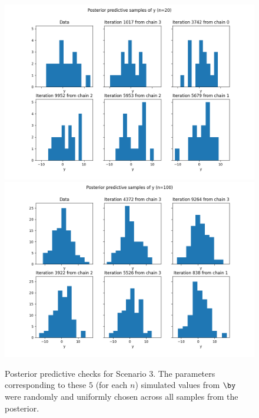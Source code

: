 \documentclass[a4paper, 10pt]{article}
\begin{document}
\begin{figure}[htb]
    \begin{center}
        \includegraphics[height=.5\textwidth]{../outputs/artificial_scenarios_n=20/scenario_3/posterior_predictive_check.png}
        \includegraphics[height=.5\textwidth]{../outputs/artificial_scenarios_n=100/scenario_3/posterior_predictive_check.png}
    \end{center}
    \caption[Posterior predictive checks for Scenario 3.]{Posterior predictive checks for Scenario 3. The parameters corresponding to these $ 5$ (for each $ n $) simulated values from $ \by $ were randomly and uniformly chosen across all samples from the posterior.}
    \label{fig: posterior predictive check scenario 3}
\end{figure}
\end{document}
